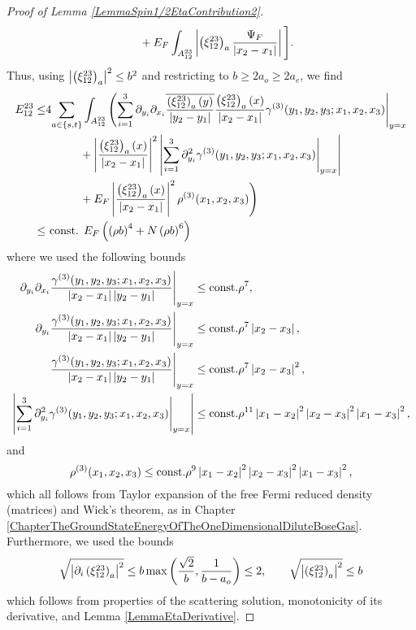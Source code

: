 \begin{proof}[Proof of Lemma \ref{LemmaSpin1/2EtaContribution2}]
\begin{equation}
\begin{aligned}
&\qquad + E_F\int_{A_{12}^{23}} \left\lvert \left(\xi_{12}^{23}\right)_a \frac{\Psi_F}{\left\lvert x_2-x_1 \right\rvert} \right\rvert\Bigg].
\end{aligned}
\end{equation}
 Thus, using $ \left\lvert \left(\xi_{12}^{23}\right)_a \right\rvert^2\leq b^2 $ and restricting to $ b\geq 2a_o\geq2a_e $, we find \begin{equation}
\begin{aligned}
E_{12}^{23}\leq& 4\!\sum_{a\in\{s,t\}} \int_{A_{12}^{23}}\Bigg(\! \sum_{i=1}^{3}\partial_{y_i}\partial_{x_i}\overline{\frac{\left(\xi_{12}^{23}\right)_a(y)}{\left\lvert y_2-y_1 \right\rvert}}\frac{\left(\xi_{12}^{23}\right)_a(x)}{\left\lvert x_2-x_1 \right\rvert}\gamma^{(3)}(y_1,y_2,y_3;x_1,x_2,x_3)\Bigg\rvert_{y=x}\\
&\qquad\quad+\left\lvert \frac{\left(\xi_{12}^{23}\right)_a(x)}{\left\lvert x_2-x_1 \right\rvert} \right\rvert^2\left\lvert \sum_{i=1}^{3}  \partial_{y_i}^2\gamma^{(3)}(y_1,y_2,y_3;x_1,x_2,x_3)\Bigg\rvert_{y=x} \right\rvert\\
&\qquad\quad+E_F\left\lvert \frac{\left(\xi_{12}^{23}\right)_a(x)}{\left\lvert x_2-x_1 \right\rvert} \right\rvert^2\rho^{(3)}(x_1,x_2,x_3)\Bigg)\\
\leq& \text{ const. } E_F\left(\left(\rho b\right)^4+N\left(\rho b\right)^6 \right)
\end{aligned}
\end{equation}
where we used the following bounds \begin{equation}
\begin{aligned}
\partial_{y_i}\partial_{x_i}\frac{\gamma^{(3)}(y_1,y_2,y_3;x_1,x_2,x_3)}{\left\lvert x_2-x_1 \right\rvert\left\lvert y_2-y_1 \right\rvert}\Bigg \lvert_{y=x}&\leq \text{const.} \rho^{7},\\
\partial_{y_i}\frac{\gamma^{(3)}(y_1,y_2,y_3;x_1,x_2,x_3)}{\left\lvert x_2-x_1 \right\rvert\left\lvert y_2-y_1 \right\rvert}\Bigg \lvert_{y=x}&\leq \text{const.} \rho^{7}\left\lvert x_2-x_3 \right\rvert,\\
\frac{\gamma^{(3)}(y_1,y_2,y_3;x_1,x_2,x_3)}{\left\lvert x_2-x_1 \right\rvert\left\lvert y_2-y_1 \right\rvert}\Bigg \lvert_{y=x}&\leq \text{const.} \rho^{7}\left\lvert x_2-x_3 \right\rvert^2,\\
\left\lvert \sum_{i=1}^{3}\partial_{y_i}^2\gamma^{(3)}(y_1,y_2,y_3;x_1,x_2,x_3) \Bigg \lvert_{y=x} \right\rvert&\leq \text{const.} \rho^{11} \left\lvert x_1-x_2 \right\rvert^2\left\lvert x_2-x_3 \right\rvert^2\left\lvert x_1-x_3 \right\rvert^2,
\end{aligned}
\end{equation}
and \begin{equation}
\rho^{(3)}(x_1,x_2,x_3)\leq\text{const.} \rho^9 \left\lvert x_1-x_2 \right\rvert^2\left\lvert x_2-x_3 \right\rvert^2\left\lvert x_1-x_3 \right\rvert^2,
\end{equation}
which all follows from Taylor expansion of the free Fermi reduced density (matrices) and Wick's theorem, as in Chapter \ref{ChapterTheGroundStateEnergyOfTheOneDimensionalDiluteBoseGas}. Furthermore, we used the bounds \begin{equation}
\sqrt{\left\lvert \partial_i\left(\xi_{12}^{23}\right)_a \right\rvert^2}\leq b \max\left(\frac{\sqrt{2}}{b},\frac{1}{b-a_o}\right)\leq 2,\qquad \sqrt{\left\lvert \left(\xi_{12}^{23}\right)_a \right\rvert^2}\leq b
\end{equation}
which follows from properties of the scattering solution, monotonicity of its derivative, and Lemma \ref{LemmaEtaDerivative}.
\end{proof}
